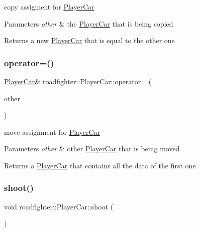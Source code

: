 copy assigment for \hyperlink{classroadfighter_1_1PlayerCar}{Player\+Car} 
\begin{DoxyParams}{Parameters}
{\em other} & the \hyperlink{classroadfighter_1_1PlayerCar}{Player\+Car} that is being copied \\
\hline
\end{DoxyParams}
\begin{DoxyReturn}{Returns}
a new \hyperlink{classroadfighter_1_1PlayerCar}{Player\+Car} that is equal to the other one 
\end{DoxyReturn}
\mbox{\label{classroadfighter_1_1PlayerCar_aa6938d2531fea4938eb0837fb2763304}} 
\subsubsection{\texorpdfstring{operator=()}{operator=()}\hspace{0.1cm}{\footnotesize\ttfamily [2/2]}}
{\footnotesize\ttfamily \hyperlink{classroadfighter_1_1PlayerCar}{Player\+Car}\& roadfighter\+::\+Player\+Car\+::operator= (\begin{DoxyParamCaption}\item[{\hyperlink{classroadfighter_1_1PlayerCar}{Player\+Car} \&\&}]{other }\end{DoxyParamCaption})\hspace{0.3cm}{\ttfamily [default]}}

move assignment for \hyperlink{classroadfighter_1_1PlayerCar}{Player\+Car} 
\begin{DoxyParams}{Parameters}
{\em other} & other \hyperlink{classroadfighter_1_1PlayerCar}{Player\+Car} that is being moved \\
\hline
\end{DoxyParams}
\begin{DoxyReturn}{Returns}
a \hyperlink{classroadfighter_1_1PlayerCar}{Player\+Car} that contains all the data of the first one 
\end{DoxyReturn}
\mbox{\label{classroadfighter_1_1PlayerCar_a2fdc34f0a8256d3fa8e36378c3c64b10}} 
\subsubsection{\texorpdfstring{shoot()}{shoot()}}
{\footnotesize\ttfamily void roadfighter\+::\+Player\+Car\+::shoot (\begin{DoxyParamCaption}{ }\end{DoxyParamCaption})}


